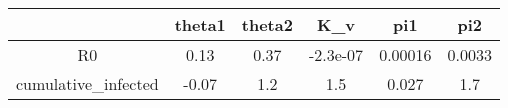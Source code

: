 \begin{tabular}{|c|c|c|c|c|c|}
\hline
& theta1 & theta2 & K_v & pi1 & pi2 \\
\hline
R0 & 0.13 & 0.37 & -2.3e-07 & 0.00016 & 0.0033 \\
\hline
cumulative_infected & -0.07 & 1.2 & 1.5 & 0.027 & 1.7 \\
\hline
\end{tabular}
